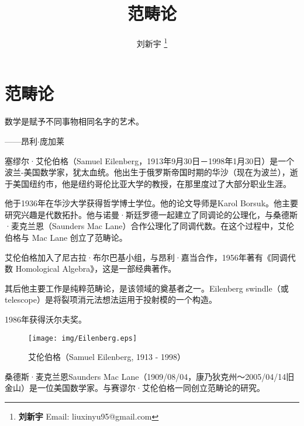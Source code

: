 \documentclass{article}
\begin{document}
\title{范畴论}

\author{刘新宇
\thanks{{\bfseries 刘新宇} \newline
  Email: liuxinyu95@gmail.com \newline}
  }

\maketitle
\fi


\ifx\wholebook\relax
\chapter{范畴论}
\fi

\epigraph{数学是赋予不同事物相同名字的艺术。}{——昂利$\cdot$庞加莱}


塞缪尔·艾伦伯格（Samuel Eilenberg，1913年9月30日－1998年1月30日）是一个波兰-美国数学家，犹太血统。他出生于俄罗斯帝国时期的华沙（现在为波兰），逝于美国纽约市，他是纽约哥伦比亚大学的教授，在那里度过了大部分职业生涯。

他于1936年在华沙大学获得哲学博士学位。他的论文导师是Karol Borsuk。他主要研究兴趣是代数拓扑。他与诺曼·斯廷罗德一起建立了同调论的公理化，与桑德斯·麦克兰恩（Saunders Mac Lane）合作公理化了同调代数。在这个过程中，艾伦伯格与 Mac Lane 创立了范畴论。

艾伦伯格加入了尼古拉·布尔巴基小组，与昂利·嘉当合作，1956年著有《同调代数 Homological Algebra》，这是一部经典著作。

其后他主要工作是纯粹范畴论，是该领域的奠基者之一。Eilenberg swindle（或 telescope）是将裂项消元法想法运用于投射模的一个构造。

1986年获得沃尔夫奖。

\begin{wrapfigure}{R}{0.3\textwidth}
 \centering
 \texttt{[image: img/Eilenberg.eps]}
 \captionsetup{labelformat=empty}
 \caption{艾伦伯格（Samuel Eilenberg, 1913 - 1998）}
 \label{fig:Pythagoras}
\end{wrapfigure}

桑德斯·麦克兰恩Saunders Mac Lane（1909/08/04，康乃狄克州～2005/04/14旧金山）是一位美国数学家。与赛谬尔·艾伦伯格一同创立范畴论的研究。
\end{document}
